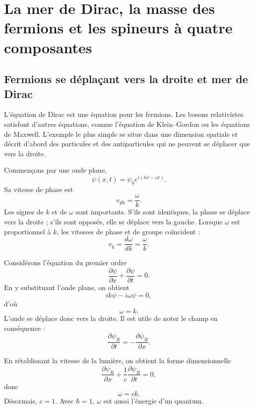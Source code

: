 \chapter{La mer de Dirac, la masse des fermions et les spineurs à quatre composantes}

\section{Fermions se déplaçant vers la droite et mer de Dirac}

L’équation de Dirac est une équation pour les fermions. Les bosons relativistes satisfont d’autres équations, comme l’équation de Klein--Gordon ou les équations de Maxwell. L’exemple le plus simple se situe dans une dimension spatiale et décrit d’abord des particules et des antiparticules qui ne peuvent se déplacer que vers la droite.

Commençons par une onde plane,
\begin{equation}
\psi(x,t)=\psi_0 e^{i(kx-\omega t)}.
\end{equation}
Sa vitesse de phase est
\begin{equation}
v_{\mathrm{ph}}=\frac{\omega}{k}.
\end{equation}
Les signes de \(k\) et de \(\omega\) sont importants. S’ils sont identiques, la phase se déplace vers la droite ; s’ils sont opposés, elle se déplace vers la gauche. Lorsque \(\omega\) est proportionnel à \(k\), les vitesses de phase et de groupe coïncident :
\begin{equation}
v_{\mathrm{g}}=\frac{d\omega}{dk}=\frac{\omega}{k}.
\end{equation}

Considérons l’équation du premier ordre
\begin{equation}
\frac{\partial\psi}{\partial x}
+
\frac{\partial\psi}{\partial t}
=0.
\end{equation}
En y substituant l’onde plane, on obtient
\begin{equation}
ik\psi-i\omega\psi=0,
\end{equation}
d’où
\begin{equation}
\omega=k.
\end{equation}
L’onde se déplace donc vers la droite. Il est utile de noter le champ en conséquence :
\begin{equation}
\frac{\partial\psi_R}{\partial t}
=
-\frac{\partial\psi_R}{\partial x}.
\end{equation}

En rétablissant la vitesse de la lumière, on obtient la forme dimensionnelle
\begin{equation}
\frac{\partial\psi_R}{\partial x}
+
\frac{1}{c}\frac{\partial\psi_R}{\partial t}
=0,
\end{equation}
donc
\begin{equation}
\omega=ck.
\end{equation}
Désormais, \(c=1\). Avec \(\hbar=1\), \(\omega\) est aussi l’énergie d’un quantum.

